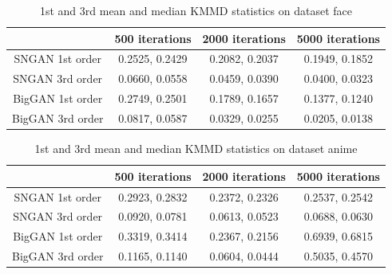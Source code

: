 \documentclass{article}
\begin{document}
\begin{table}[hbt!]
\centering
\caption{1st and 3rd mean and median KMMD statistics on dataset face}
 \begin{tabular}{||c | c | c | c||} 
 \hline
 & 500 iterations & 2000 iterations & 5000 iterations \\ [0.5ex] 
 \hline\hline
 SNGAN 1st order & 0.2525, 0.2429 & 0.2082, 0.2037 & 0.1949, 0.1852 \\ 
 \hline
 SNGAN 3rd order & 0.0660, 0.0558 & 0.0459, 0.0390 & 0.0400, 0.0323 \\ 
 \hline
 BigGAN 1st order & 0.2749, 0.2501 & 0.1789, 0.1657 & 0.1377, 0.1240 \\
 \hline
 BigGAN 3rd order & 0.0817, 0.0587 & 0.0329, 0.0255 & 0.0205, 0.0138 \\
 \hline
\end{tabular}
\end{table}

\begin{table}[hbt!]
\centering
\caption{1st and 3rd mean and median KMMD statistics on dataset anime}
 \begin{tabular}{||c | c | c | c||} 
 \hline
 & 500 iterations & 2000 iterations & 5000 iterations \\ [0.5ex] 
 \hline\hline
 SNGAN 1st order & 0.2923, 0.2832 & 0.2372, 0.2326 & 0.2537, 0.2542 \\ 
 \hline
 SNGAN 3rd order & 0.0920, 0.0781 & 0.0613, 0.0523 & 0.0688, 0.0630 \\ 
 \hline
 BigGAN 1st order & 0.3319, 0.3414 & 0.2367, 0.2156 & 0.6939, 0.6815 \\
 \hline
 BigGAN 3rd order & 0.1165, 0.1140 & 0.0604, 0.0444 & 0.5035, 0.4570 \\
 \hline
\end{tabular}
\end{table}

\pagebreak
\end{document}
